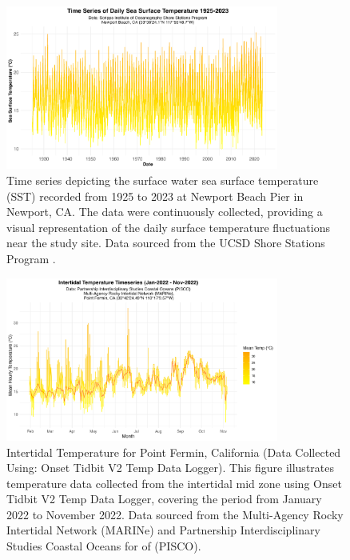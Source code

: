 \documentclass[
  12pt,
]{article}
\begin{document}
\begin{figure}[htbp]
  \centering
  \includegraphics[width=0.8\textwidth]{Images/SST_timeseries_plot.png}
  \caption{Time series depicting the surface water sea surface temperature (SST) recorded from 1925 to 2023 at Newport Beach Pier in Newport, CA. The data were continuously collected, providing a visual representation of the daily surface temperature fluctuations near the study site. Data sourced from the UCSD Shore Stations Program \citep{carter2022shore}.}
  \label{fig:sst-timeseries}
\end{figure}

\begin{figure}[htbp]
  \centering
  \includegraphics[width=0.8\textwidth]{Images/intertidal_timeseries_plot.png}
  \caption{Intertidal Temperature for Point Fermin, California (Data Collected Using: Onset Tidbit V2 Temp Data Logger). This figure illustrates temperature data collected from the intertidal mid zone using Onset Tidbit V2 Temp Data Logger, covering the period from January 2022 to November 2022. Data sourced from the Multi-Agency Rocky Intertidal Network (MARINe) and Partnership Interdisciplinary Studies Coastal Oceans for of (PISCO). \citep{marine_pisco_burnaford_2023}}
  \label{fig:intertidal-timeseries}
\end{figure}
\end{document}
